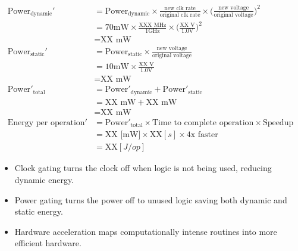 \documentclass[11pt]{article}
\begin{document}
    \begin{tcolorbox}[colback=CrispBlue!5!white,colframe=CrispBlue!75!black,title=Assuming you could safely drop the voltage to 0.6V when operating at a 200MHz clock recalculate the power draw and energy per cryptographic operation. Assume the leakage current remains the same.]
        \begin{align*}
            \text{Power}_{\text{dynamic}}' &= \text{Power}_{\text{dynamic}} \times \frac{\text{new clk rate}}{\text{original clk rate}} \times \biggl(\frac{\text{new voltage}}{\text{original voltage}}\biggr)^2\\
            &= 70\text{mW} \times \frac{\text{XXX MHz}}{1\text{GHz}} \times \biggl(\frac{\text{XX V}}{1.0\text{V}}\biggr)^2\\
            &= \text{XX mW}\\[1em]
            \text{Power}_{\text{static}}' &= \text{Power}_{\text{static}} \times \frac{\text{new voltage}}{\text{original voltage}}\\
            &= 10\text{mW} \times \frac{\text{XX V}}{1.0\text{V}}\\
            &= \text{XX mW}\\[1em]
            \text{Power}'_{\text{total}} &= \text{Power}'_{\text{dynamic}} + \text{Power}'_{\text{static}}\\
            &= \text{XX mW} + \text{XX mW}\\
            &= \text{XX mW}\\[1em]
            \text{Energy per operation}' &= \text{Power}'_\text{total} \times \text{Time to complete operation} \times \text{Speedup}\\
            &= \text{XX [mW]} \times \text{XX}[s] \times 4\text{x faster}\\
            &= \text{XX}[J/op]
        \end{align*}
    \end{tcolorbox}

    \begin{tcolorbox}[colback=CrispBlue!5!white,colframe=CrispBlue!75!black,title=The above questions looked at how the power and energy can be changed by varying the clock rate and voltage of a processor. Modern processors change these parameters dynamically using DVFS. What are some other techniques for reducing energy? Briefly describe these techniques.]
        \begin{itemize}
            \item Clock gating turns the clock off when logic is not being used, reducing dynamic energy.
            \item Power gating turns the power off to unused logic saving both dynamic and static energy.
            \item Hardware acceleration maps computationally intense routines into more efficient hardware.
        \end{itemize}
    \end{tcolorbox}
\end{document}
